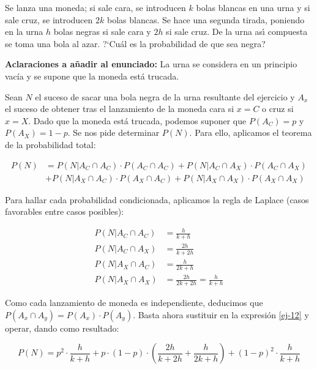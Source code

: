\problem
Se lanza una moneda; si sale cara, se introducen  $k$ bolas blancas en una urna
y si sale cruz, se introducen  $2k$ bolas blancas. Se hace una  segunda  tirada,
poniendo en la urna $h$ bolas negras si sale cara y $2h$ si sale cruz. De la urna  as{\'\i}
compuesta se toma una bola al azar. ?`Cu{\'a}l es la probabilidad de que sea
negra?

\textbf{Aclaraciones a añadir al enunciado:} La urna se considera en un principio vacía y se supone que la moneda está trucada. 

Sean $N$ el suceso de sacar una bola negra de la urna resultante del ejercicio y $A_{x}$ el suceso de obtener tras el lanzamiento de la moneda cara si  $x=C$ o cruz si $x=X$. Dado que la moneda está trucada, podemos suponer que $P(A_C) = p$ y $P(A_X) = 1 - p$. Se nos pide determinar $P(N)$. Para ello, aplicamos el teorema de la probabilidad total: 


\begin{equation} \label{ej-12}
\begin{split}
P(N) & =  P(N|A_C \cap A_C) · P(A_C \cap A_C) + P(N|A_C \cap A_X) · P(A_C \cap A_X) \\
& + P(N|A_X \cap A_C) · P(A_X \cap A_C) + P(N|A_X \cap A_X) · P(A_X \cap A_X)
\end{split}
\end{equation}

Para hallar cada probabilidad condicionada, aplicamos la regla de Laplace (casos favorables entre casos posibles):

\begin{equation*}
\begin{split}
P(N|A_C \cap A_C) & = \frac{h}{k+h} \\
P(N|A_C \cap A_X) & = \frac{2h}{k+2h} \\
P(N|A_X \cap A_C) & = \frac{h}{2k+h} \\
P(N|A_X \cap A_X) & = \frac{2h}{2k+2h} = \frac{h}{k+h}
\end{split}
\end{equation*}

Como cada lanzamiento de moneda es independiente, deducimos que $P(A_x \cap A_y) = P(A_x) · P(A_y)$. Basta ahora sustituir en la expresión \ref{ej-12} y operar, dando como resultado:

$$P(N) = p^2·\frac{h}{k+h} + p·(1-p)·(\dfrac{2h}{k+2h} + \frac{h}{2k+h}) + (1-p)^2·\frac{h}{k+h}$$